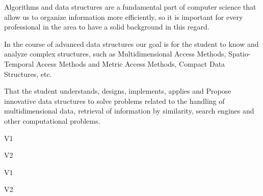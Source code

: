 \begin{syllabus}


\begin{justification}
Algorithms and data structures are a fundamental part of computer science that allow us to organize information more efficiently, so it is important for every professional in the area to have a solid background in this regard.

In the course of advanced data structures our goal is for the student to know and analyze
complex structures, such as Multidimensional Access Methods, Spatio-Temporal Access Methods and
Metric Access Methods, Compact Data Structures, etc.
\end{justification}

\begin{goals}
\item That the student understands, designs, implements, applies and
Propose innovative data structures to solve problems related to the handling of multidimensional data, retrieval of information by similarity, search engines and
other computational problems.
\end{goals}

\begin{outcomes}{V1}
   \item {}
   \item {}
   \item {}
\end{outcomes}

\begin{outcomes}{V2}
   \item {}
   \item {}
   \item {}
\end{outcomes}

\begin{competences}{V1}
    \item {} 
    \item {}
    \item {}
\end{competences}

\begin{competences}{V2}
    \item {} 
    \item {}
    \item {}
\end{competences}


\end{syllabus}
